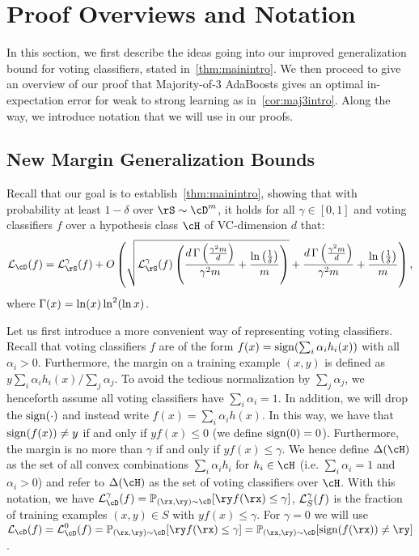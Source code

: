 \section{Proof Overviews and Notation}
In this section, we first describe the ideas going into our improved generalization bound for voting classifiers, stated in~\cref{thm:mainintro}. We then proceed to give an overview of our proof that Majority-of-3 AdaBoosts gives an optimal in-expectation error for weak to strong learning as in~\cref{cor:maj3intro}. Along the way, we introduce notation that we will use in our proofs.


\subsection{New Margin Generalization Bounds}
Recall that our goal is to establish~\cref{thm:mainintro}, showing that with probability at least $1-\delta$ over $ \rS \sim \cD^m$, it holds for all $ \gamma\in\left[0,1\right] $ and voting classifiers $f$ over a hypothesis class $\cH$ of VC-dimension $d$ that:
\begin{align}
 \ls_{\cD}(f)= \ls^{\gamma}_{\rS}(f)+O\left(\sqrt{\ls^{\gamma}_{\rS}(f)\left(\frac{d\func{\left(\frac{\gamma^{2}m}{d} \right)}}{\gamma^{2}m}+\frac{\ln{\left(\frac{1}{\delta}\right)}}{m} \right)}+\frac{d\func{\left(\frac{\gamma^{2}m}{d} \right)}}{\gamma^{2}m}+\frac{\ln{\left(\frac{1}{\delta}\right)}}{m} \right),\label{eq:overviewgoal}
\end{align}
where $\operatorname{\Gamma}(x) = \ln(x)\ln^2(\ln x)$.

Let us first introduce a more convenient way of representing voting classifiers. Recall that voting classifiers $f$ are of the form $f(x) = \operatorname{\mathrm{sign}}(\sum_i \alpha_i h_i(x))$ with all $\alpha_i > 0$. Furthermore, the margin on a training example $(x,y)$ is defined as $y \sum_i \alpha_i h_i(x)/\sum_j \alpha_j$. To avoid the tedious normalization by $\sum_j \alpha_j$, we henceforth assume all voting classifiers have $\sum_i \alpha_i=1$. In addition, we will drop the $\operatorname{\mathrm{sign}}(\cdot)$ and instead write $f(x) = \sum_i \alpha_i h(x)$. In this way, we have that $\operatorname{\mathrm{sign}}(f(x)) \neq y$ if and only if $y f(x) \leq 0$ (we define $\operatorname{\mathrm{sign}}(0)=0$). Furthermore, the margin is no more than $\gamma$ if and only if $y f(x) \leq \gamma$. We hence define $\dlh$ as the set of all convex combinations $\sum_i \alpha_i h_i$ for $h_i \in \cH$ (i.e. $\sum_i \alpha_i =1$ and $ \alpha_{i}>0 $) and refer to $\dlh$ as the set of voting classifiers over $\cH$. With this notation, we have $\ls^\gamma_\cD(f) = \Pr_{(\rx, \ry) \sim \cD}[\ry f(\rx) \leq \gamma]$, $\operatorname{\mathcal{L}}^\gamma_S(f)$ is the fraction of training examples $(x,y) \in S$ with $yf(x) \leq \gamma.$ For $ \gamma=0 $ we will use  $\ls_\cD(f)= \ls^0_\cD(f) =\Pr_{(\rx, \ry) \sim \cD}[\ry f(\rx) \leq \gamma]=\Pr_{(\rx, \ry) \sim \cD}[\sign(f(\rx))\not=\ry]$.

